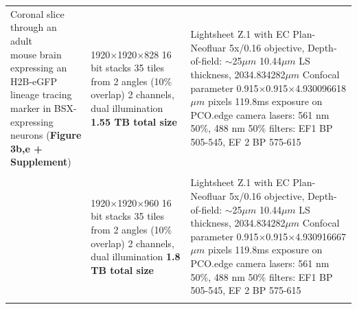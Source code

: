 \documentclass[]{spie}  %
\begin{document}
\begin{landscape}
{\begin{longtable}{lll}
 \multirowcell{2}[-4ex][l]{Coronal slice through an adult \\mouse brain expressing an H2B-eGFP \\lineage tracing marker in BSX-expressing \\neurons (\textbf{Figure 3b,e + Supplement})} &            \makecell[l]{1920$\times$1920$\times$828 16 bit stacks\\35 tiles from 2 angles (10\% overlap) \\2 channels, dual illumination\\\textbf{1.55 TB total size}}  &                                                                    \makecell[l]{Lightsheet Z.1 with EC Plan-Neofluar 5x/0.16 objective, Depth-of-field: $\sim$25$\mu{}m$ \\10.44$\mu{}m$ LS thickness, 2034.834282$\mu{}m$ Confocal parameter\\0.915$\times$0.915$\times$4.930096618$\mu{}m$ pixels\\119.8ms exposure on PCO.edge camera\\lasers: 561 nm 50\%, 488 nm 50\%\\filters: EF1 BP 505-545, EF 2 BP 575-615} \\ \\
                                                                                                                                    &             \makecell[l]{1920$\times$1920$\times$960 16 bit stacks\\35 tiles from 2 angles (10\% overlap) \\2 channels, dual illumination\\\textbf{1.8 TB total size}}  &                                                                    \makecell[l]{Lightsheet Z.1 with EC Plan-Neofluar 5x/0.16 objective, Depth-of-field: $\sim$25$\mu{}m$ \\10.44$\mu{}m$ LS thickness, 2034.834282$\mu{}m$ Confocal parameter\\0.915$\times$0.915$\times$4.930916667$\mu{}m$ pixels\\119.8ms exposure on PCO.edge camera\\lasers: 561 nm 50\%, 488 nm 50\%\\filters: EF1 BP 505-545, EF 2 BP 575-615} \\ \\


\end{longtable}}
\end{landscape}
\end{document}
